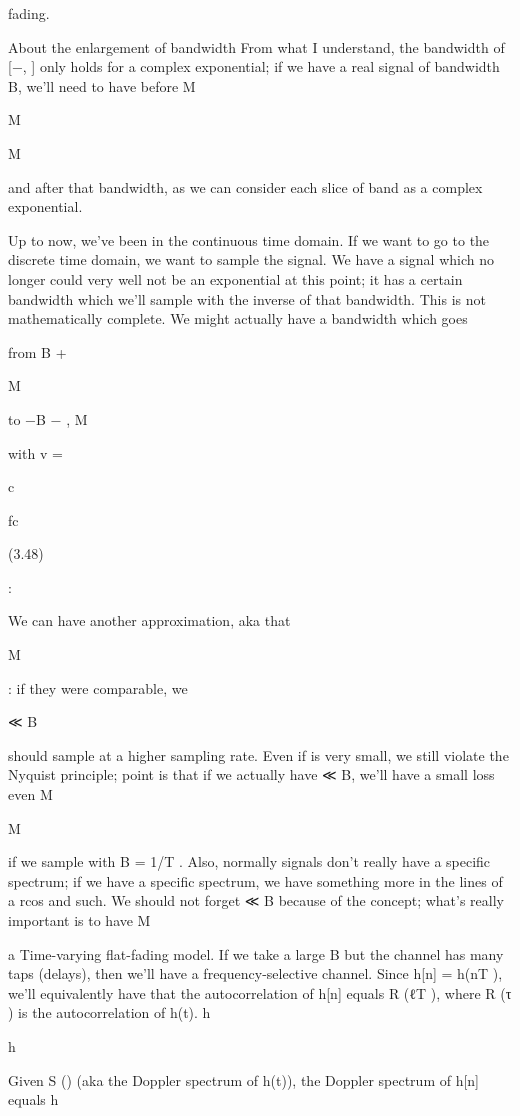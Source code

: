 {{{{fading.

​About the enlargement of bandwidth From what I understand, the bandwidth of [−\nu , \nu ] only holds for a complex exponential; if we have a real signal of bandwidth B, we'll need to have \nu before M

M

M

and after that bandwidth, as we can consider each slice of band as a complex exponential.

Up to now, we've been in the continuous time domain. If we want to go to the discrete time domain, we want to sample the signal.
We have a signal which no longer could very well not be an exponential at this point; it has a certain bandwidth which we'll sample with the inverse of that bandwidth.
This is not mathematically complete. We might actually have a bandwidth which goes

from B + \nu

M

to −B − \nu ,
M

with v
\nuM =

c

fc

(3.48)

:

We can have another approximation, aka that \nu

M

: if they were comparable, we

≪ B

should sample at a higher sampling rate. Even if \nu is very small, we still violate the Nyquist principle; point is that if we actually have \nu ≪ B, we'll have a small loss even M

M

if we sample with B = 1/T .
Also, normally signals don't really have a specific spectrum; if we have a specific spectrum, we have something more in the lines of a rcos and such.
We should not forget \nu ≪ B because of the concept; what's really important is to have M

a Time-varying flat-fading model. If we take a large B but the channel has many taps
(delays), then we'll have a frequency-selective channel.
Since h[n] = h(nT ), we'll equivalently have that the autocorrelation of h[n] equals R (ℓT ),
where R (τ ) is the autocorrelation of h(t).
h

h

Given S (\nu) (aka the Doppler spectrum of h(t)), the Doppler spectrum of h[n] equals h

}}}}
